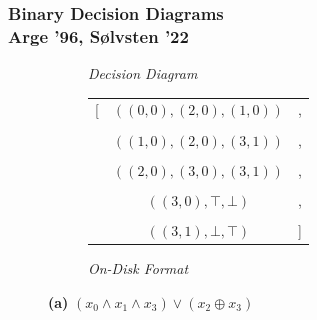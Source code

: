 \documentclass[english, aspectratio=169]{beamer}
\newcommand{\triple}[3]{\ensuremath{(#1, #2, #3)}}
\begin{document}
\begin{frame}
  \frametitle{Binary Decision Diagrams \\ Arge '96, S{\o}lvsten '22}

  \begin{figure}
    \centering

    \begin{subfigure}[b]{0.45\linewidth}
      \centering

      \begin{tikzpicture}[scale=1, every node/.style={transform shape}]
        
      \end{tikzpicture}

      \emph{\small Decision Diagram}
    \end{subfigure}
    \hspace{20pt}
    \begin{subfigure}[b]{0.45\linewidth}
      \centering
      { \small
        \begin{tabular}{r c l}
          [ & $\triple{(0,0)}{(2,0)}{(1,0)}$ & ,
          \\ \\
            & $\triple{(1,0)}{(2,0)}{(3,1)}$ & ,
          \\ \\
            & $\triple{(2,0)}{(3,0)}{(3,1)}$ & ,
          \\ \\
            & $\triple{(3,0)}{\top}{\bot}$   & ,
          \\ \\
            & $\triple{(3,1)}{\bot}{\top}$   & ]
        \end{tabular}
        \vspace{6pt}
      }

      \emph{\small On-Disk Format}
    \end{subfigure}

    \caption{\textbf{(a)} $(x_0 \wedge x_1 \wedge x_3) \vee (x_2 \oplus x_3)$}
  \end{figure}

\end{frame}
\end{document}
